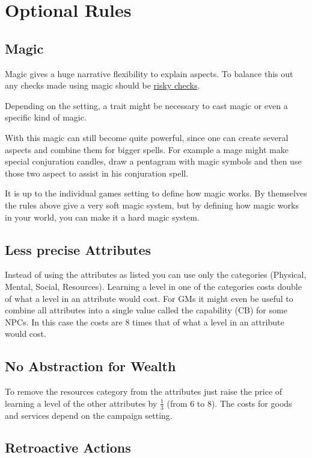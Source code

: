 \documentclass[11pt]{article}
\begin{document}
{\section{Optional Rules}
\label{sec:orgd018f16}
\subsection{Magic}
\label{sec:orgdef8201}

Magic gives a huge narrative flexibility to explain aspects. To balance this out any checks made using magic should be \hyperref[sec:org94c7aba]{risky checks}.

Depending on the setting, a trait might be necessary to cast magic or even a specific kind of magic.

With this magic can still become quite powerful, since one can create several aspects and combine them for bigger spells. For example a mage might make special conjuration candles, draw a pentagram with magic symbols and then use those two aspect to assist in his conjuration spell.

It is up to the individual games setting to define how magic works. By themselves the rules above give a very soft magic system, but by defining how magic works in your world, you can make it a hard magic system. 

\subsection{Less precise Attributes}
\label{sec:orgad1ec5a}
Instead of using the attributes as listed you can use only the categories (Physical, Mental, Social, Resources). Learning a level in one of the categories costs double of what a level in an attribute would cost.
For GMs it might even be useful to combine all attributes into a single value called the capability (CB) for some NPCs. In this case the costs are 8 times that of what a level in an attribute would cost.

\subsection{No Abstraction for Wealth}
\label{sec:org152ed25}

To remove the resources category from the attributes just raise the price of learning a level of the other attributes by \(\frac{1}{3}\) (from 6 to 8). The costs for goods and services
depend on the campaign setting.

\subsection{Retroactive Actions}
\label{sec:org5e3caed}

}
\end{document}
